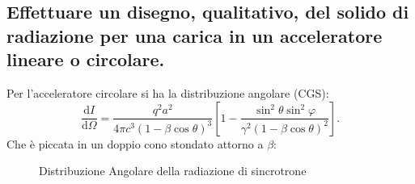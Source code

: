\subsection[\hspace{1mm} Solido di radiaziome per carica in moto circolare]{Effettuare un disegno, qualitativo, del solido di radiazione per una carica in un acceleratore lineare o circolare.}
Per l'acceleratore circolare si ha la distribuzione angolare (CGS):
\[
	\frac{\mbox{d} I}{\mbox{d} \Omega} = \frac{q^2a^2}{4\pi c^3\left( 1-\beta\cos\theta \right) ^3} \left[ 1-\frac{\sin^2\theta\sin^2\varphi}{\gamma^2\left(1-\beta\cos\theta \right) ^2} \right] 	
.\]
Che è piccata in un doppio cono stondato attorno a $\beta$:
\begin{figure}[H]
    \centering
    \caption{Distribuzione Angolare della radiazione di sincrotrone}
    \label{fig:distribuzione-sincrotrone}
\end{figure}

